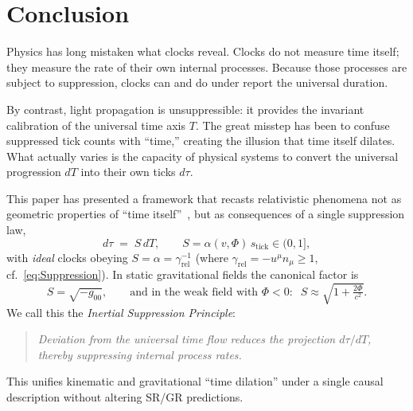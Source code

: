 \documentclass[12pt]{article}
\theoremstyle{plain}
\begin{document}
\section*{Conclusion}

Physics has long mistaken what clocks reveal. Clocks do not measure time itself; they measure the rate of their own internal processes. Because those processes are subject to suppression, clocks can and do under report the universal duration.

\medskip
\noindent
By contrast, light propagation is unsuppressible: it provides the invariant calibration of the universal time axis $T$. The great misstep has been to confuse suppressed tick counts with “time,” creating the illusion that time itself dilates. What actually varies is the capacity of physical systems to convert the universal progression $dT$ into their own ticks $d\tau$.

\medskip
\noindent
This paper has presented a framework that recasts relativistic phenomena not as geometric properties of “time itself”~\cite{Einstein1905,Minkowski1908}, but as consequences of a single suppression law,
\begin{equation}
d\tau \;=\; S\,dT,\qquad S=\alpha(v,\Phi)\,s_{\mathrm{tick}}\in(0,1],
\label{eq:ConclusionSuppression}
\end{equation}
with \emph{ideal} clocks obeying $S=\alpha=\gamma_{\mathrm{rel}}^{-1}$ (where $\gamma_{\mathrm{rel}}=-u^\mu n_\mu\ge1$, cf.~\eqref{eq:Suppression}). In static gravitational fields the canonical factor is
\begin{equation}
S=\sqrt{-g_{00}},\qquad\text{and in the weak field with }\Phi<0:\;\; S\approx\sqrt{1+\tfrac{2\Phi}{c^2}}.
\label{eq:ConclusionGR}
\end{equation}
We call this the \emph{Inertial Suppression Principle}:
\begin{quote}
\textit{Deviation from the universal time flow reduces the projection $d\tau/dT$, thereby suppressing internal process rates.}
\end{quote}
This unifies kinematic and gravitational “time dilation” under a single causal description without altering SR/GR predictions.
\end{document}
